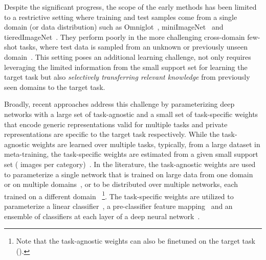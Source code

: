Despite the significant progress, the scope of the early methods has been limited to a restrictive setting where training and test samples come from a single domain (or data distribution) such as Omniglot~\cite{Lake1332}, miniImageNet~\cite{vinyals2016matching} and tieredImageNet~\cite{ren2018meta}.
They perform poorly in the more challenging cross-domain few-shot tasks, where test data is sampled from an unknown or previously unseen domain~\cite{triantafillou2019meta}.
This setting poses an additional learning challenge, not only requires leveraging the limited information from the small support set for learning the target task but also \emph{selectively transferring relevant knowledge} from previously seen domains to the target task.

Broadly, recent approaches address this challenge by parameterizing deep networks with a large set of task-agnostic and a small set of task-specific weights that encode generic representations valid for multiple tasks and private representations are specific to the target task respectively.
While the task-agnostic weights are learned over multiple tasks, typically, from a large dataset in meta-training, the task-specific weights are estimated from a given small support set ( images per category)~\cite{requeima2019fast,bateni2020improved,lee2019meta,dvornik2020selecting,liu2020universal,li2021universal,triantafillou2021flute}.
In the literature, the task-agnostic weights are used to parameterize a single network that is trained on large data from one domain~\cite{requeima2019fast,bateni2020improved,doersch2020crosstransformers} or on multiple domains~\cite{li2021universal}, or to be distributed over multiple networks, each trained on a different domain~\cite{dvornik2020selecting,liu2020universal,triantafillou2021flute} \footnote{Note that the task-agnostic weights can also be finetuned on the target task (\eg \cite{chen2020new,dhillon2019baseline}).}.
The task-specific weights are utilized to parameterize a linear classifier~\cite{lee2019meta}, a pre-classifier feature mapping~\cite{li2021universal} and an ensemble of classifiers at each layer of a deep neural network~\cite{adler2020cross}.

